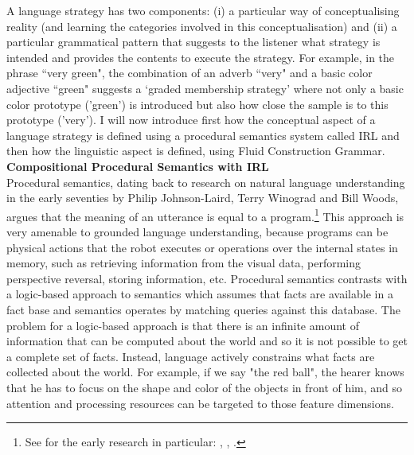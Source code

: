 A language strategy has two components: (i) a particular way of conceptualising reality (and learning the categories involved
in this conceptualisation) and (ii) a particular grammatical pattern that suggests to the listener what strategy is intended 
and provides the contents to execute the strategy. For example, in the phrase ``very green", the combination of an adverb 
``very" and a basic color adjective ``green" suggests a `graded membership strategy' where not only a basic color prototype
('green') is introduced but also how close the sample is to this prototype ('very'). I will now introduce first how 
the conceptual aspect of a language strategy is defined using a procedural semantics system called IRL and then how the 
linguistic aspect is defined, using Fluid Construction Grammar. \\ 

{\bf Compositional Procedural Semantics with IRL}\\

Procedural semantics, dating back to research on natural language understanding in the 
early seventies by Philip Johnson-Laird, Terry Winograd and Bill Woods, argues that the meaning of an utterance is 
equal to a program.\footnote{See for the early research in particular: \cite{Winograd:1971}, \cite{Woods:1981}, 
\cite{Johnson-Laird:1977}.} 
This approach is very amenable to grounded language understanding, because programs can be physical 
actions that the robot executes or operations over the internal states in memory, such as retrieving information
from the visual data, performing perspective reversal, storing information, etc. Procedural semantics
contrasts with a logic-based approach to semantics which assumes that facts are available in a fact base and semantics operates
by matching queries against this database. The problem for a logic-based approach
is that there is an infinite amount of
information that can be computed about the world and so it is not possible to get a 
complete set of facts. Instead, language actively constrains what facts are collected about the world. For example, if 
we say "the red ball", the hearer knows that he has to focus on the shape and color of the objects in front of him, 
and so attention and processing resources can be targeted to those feature dimensions. 

